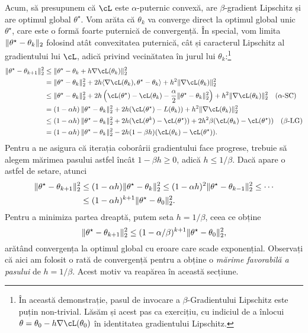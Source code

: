 \documentclass[../../book-main_ro.tex]{subfiles}
\begin{document}
Acum, să presupunem că \(\cL\) este \(\alpha\)-puternic convexă, are \(\beta\)-gradient Lipschitz și are optimul global \(\theta^{\star}\). Vom arăta că \(\theta_{k}\) va converge direct la optimul global unic \(\theta^{\star}\), care este o formă foarte puternică de convergență. În special, vom limita \(\norm{\theta^{\star} - \theta_{k}}_{2}\) folosind atât convexitatea puternică, cât și caracterul Lipschitz al gradientului lui \(\cL\), adică privind vecinătatea în jurul lui \(\theta_{k}\):\footnote{În această demonstrație, pasul de invocare a \(\beta\)-Gradientului Lipschitz este puțin non-trivial. Lăsăm și acest pas ca exercițiu, cu indiciul de a înlocui \(\theta = \theta_{0} - h\nabla \cL(\theta_{0})\) în identitatea gradientului Lipschitz.}
\begin{align}
    \norm{\theta^{\star} - \theta_{k + 1}}_{2}^{2}
    &\leq \norm{\theta^{\star} - \theta_{k} + h\nabla \cL(\theta_{k})}_{2}^{2} \\ 
    &= \norm{\theta^{\star} - \theta_{k}}_{2}^{2} + 2h\ip{\nabla \cL(\theta_{k})}{\theta^{\star} - \theta_{k}} + h^{2}\norm{\nabla \cL(\theta_{k})}_{2}^{2} \\ 
    &\leq \norm{\theta^{\star} - \theta_{k}}_{2}^{2} + 2h\bp{\cL(\theta^{\star}) - \cL(\theta_{k}) - \frac{\alpha}{2}\norm{\theta^{\star} - \theta_{k}}_{2}^{2}} + h^{2}\norm{\nabla \cL(\theta_{k})}_{2}^{2} \quad \text{(\(\alpha\)-SC)} \\
    &= \bp{1 - \alpha h}\norm{\theta^{\star} - \theta_{k}}_{2}^{2} + 2h(\cL(\theta^{\star}) - L(\theta_{k})) + h^{2}\norm{\nabla \cL(\theta_{k})}_{2}^{2} \\
    &\leq \bp{1 - \alpha h}\norm{\theta^{\star} - \theta_{k}}_{2}^{2} + 2h(\cL(\theta^{k}) - \cL(\theta^{\star})) + 2h^{2}\beta(\cL(\theta_{k}) - \cL(\theta^{\star})) \quad \text{(\(\beta\)-LG)} \\
    &= \bp{1 - \alpha h}\norm{\theta^{\star} - \theta_{k}}_{2}^{2} - 2h(1 - \beta h)(\cL(\theta_{k}) - \cL(\theta^{\star})).
\end{align}
Pentru a ne asigura că iterația coborârii gradientului face progrese, trebuie să alegem mărimea pasului astfel încât \(1 - \beta h \geq 0\), adică \(h \leq 1/\beta\). Dacă apare o astfel de setare, atunci
\begin{align}
    \norm{\theta^{\star} - \theta_{k + 1}}_{2}^{2} 
    &\leq (1 - \alpha h)\norm{\theta^{\star} - \theta_{k}}_{2}^{2} \leq (1 - \alpha h)^{2}\norm{\theta^{\star} - \theta_{k - 1}}_{2}^{2} \leq \cdots \\ 
    &\leq (1 - \alpha h)^{k + 1}\norm{\theta^{\star} - \theta_{0}}_{2}^{2}.
\end{align}
Pentru a minimiza partea dreaptă, putem seta \(h = 1/\beta\), ceea ce obține
\begin{equation}
    \norm{\theta^{\star} - \theta_{k + 1}}_{2}^{2} \leq (1 - \alpha/\beta)^{k + 1}\norm{\theta^{\star} - \theta_{0}}_{2}^{2},
\end{equation}
arătând convergența la optimul global cu eroare care scade exponențial. Observați că aici am folosit o rată de convergență pentru a obține o \textit{mărime favorabilă a pasului} de \(h = 1/\beta\). Acest motiv va reapărea în această secțiune.
\end{document}
